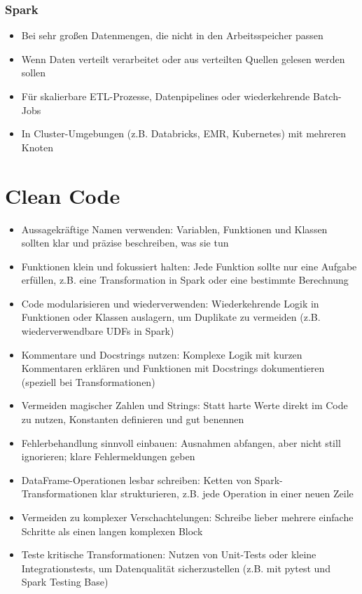 \documentclass[11pt]{scrartcl}
\begin{document}
\subsubsection{Spark}
\begin{itemize}
	\item Bei sehr großen Datenmengen, die nicht in den Arbeitsspeicher passen
	\item Wenn Daten verteilt verarbeitet oder aus verteilten Quellen gelesen werden sollen
	\item Für skalierbare ETL-Prozesse, Datenpipelines oder wiederkehrende Batch-Jobs
	\item In Cluster-Umgebungen (z.B. Databricks, EMR, Kubernetes) mit mehreren Knoten
\end{itemize}


\section{Clean Code}
\begin{itemize}
	\item Aussagekräftige Namen verwenden: Variablen, Funktionen und Klassen sollten klar und präzise beschreiben, was sie tun 
	\item Funktionen klein und fokussiert halten: Jede Funktion sollte nur eine Aufgabe erfüllen, z.B. eine Transformation in Spark oder eine bestimmte Berechnung
	\item Code modularisieren und wiederverwenden: Wiederkehrende Logik in Funktionen oder Klassen auslagern, um Duplikate zu vermeiden (z.B. wiederverwendbare UDFs in Spark)
	\item Kommentare und Docstrings nutzen: Komplexe Logik mit kurzen Kommentaren erklären und Funktionen mit Docstrings dokumentieren (speziell bei Transformationen)
	\item Vermeiden magischer Zahlen und Strings: Statt harte Werte direkt im Code zu nutzen, Konstanten definieren und gut benennen
	\item Fehlerbehandlung sinnvoll einbauen: Ausnahmen abfangen, aber nicht still ignorieren; klare Fehlermeldungen geben
	\item DataFrame-Operationen lesbar schreiben: Ketten von Spark-Transformationen klar strukturieren, z.B. jede Operation in einer neuen Zeile
	\item Vermeiden zu komplexer Verschachtelungen:	Schreibe lieber mehrere einfache Schritte als einen langen komplexen Block
	\item Teste kritische Transformationen: Nutzen von Unit-Tests oder kleine Integrationstests, um Datenqualität sicherzustellen (z.B. mit pytest und Spark Testing Base)
\end{itemize}
\end{document}
